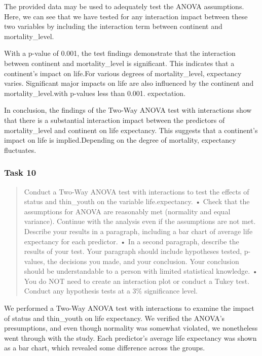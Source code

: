 \documentclass[
]{article}
\begin{document}
The provided data may be used to adequately test the ANOVA assumptions.
Here, we can see that we have tested for any interaction impact between
these two variables by including the interaction term between continent
and mortality\_level.

With a p-value of 0.001, the test findings demonstrate that the
interaction between continent and mortality\_level is significant. This
indicates that a continent's impact on life.For various degrees of
mortality\_level, expectancy varies. Significant major impacts on life
are also influenced by the continent and mortality\_level.with p-values
less than 0.001. expectation.

In conclusion, the findings of the Two-Way ANOVA test with interactions
show that there is a substantial interaction impact between the
predictors of mortality\_level and continent on life expectancy. This
suggests that a continent's impact on life is implied.Depending on the
degree of mortality, expectancy fluctuates.

\hypertarget{task-10}{%
\subsubsection{Task 10}\label{task-10}}

\begin{quote}
Conduct a Two-Way ANOVA test with interactions to test the effects of
status and thin\_youth on the variable life.expectancy. • Check that the
assumptions for ANOVA are reasonably met (normality and equal variance).
Continue with the analysis even if the assumptions are not met. Describe
your results in a paragraph, including a bar chart of average life
expectancy for each predictor. • In a second paragraph, describe the
results of your test. Your paragraph should include hypotheses tested,
p-values, the decisions you made, and your conclusion. Your conclusion
should be understandable to a person with limited statistical knowledge.
• You do NOT need to create an interaction plot or conduct a Tukey test.
Conduct any hypothesis tests at a 3\% significance level.
\end{quote}

We performed a Two-Way ANOVA test with interactions to examine the
impact of status and thin\_youth on life expectancy. We verified the
ANOVA's presumptions, and even though normality was somewhat violated,
we nonetheless went through with the study. Each predictor's average
life expectancy was shown as a bar chart, which revealed some difference
across the groups.
\end{document}
